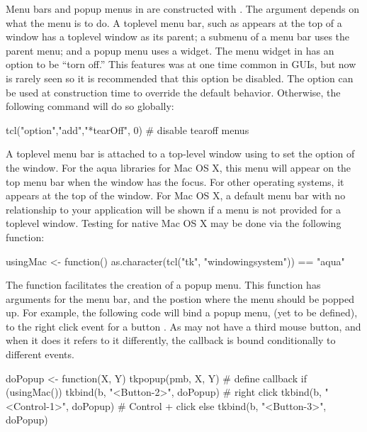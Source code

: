 Menu bars and popup menus in \Tk\/ are constructed with
. The  argument depends on what the menu is
to do. A toplevel menu bar, such as appears at the top of a window has
a toplevel window as its parent; a submenu of a menu bar uses the
parent menu; and a popup menu uses a widget.  The menu widget in \Tk\/
has an option to be ``torn off.'' This features was at one time common
in GUIs, but now is rarely seen so it is recommended that this option
be disabled. The  option can be used at
construction time to override the default behavior. Otherwise, the
following command will do so globally:
\begin{Schunk}
\begin{Sinput}
 tcl("option","add","*tearOff", 0)    # disable tearoff menus
\end{Sinput}
\end{Schunk}

A toplevel menu bar is attached to a top-level window using 
to set the  option of the window. For the aqua \TK\/
libraries for Mac OS X, this menu will appear on the top menu bar when
the window has the focus. For other operating systems, it appears at
the top of the window. For Mac OS X, a default menu bar with no
relationship to your application will be shown if a menu is not
provided for a toplevel window. Testing for native Mac OS X may be done via
the following function:
\begin{Schunk}
\begin{Sinput}
 usingMac <- function()  
   as.character(tcl("tk", "windowingsystem")) == "aqua"
\end{Sinput}
\end{Schunk}

The  function facilitates the creation of a popup
menu.  This function has arguments for the menu bar, and the postion
where the menu should be popped up. For example, the following code
will bind a popup menu,  (yet to be defined), to the right click event for a
button . As \OSX\/ may not have a third mouse button, and when
it does it refers to it differently, the callback is bound
conditionally to different events.


\begin{Schunk}
\begin{Sinput}
 doPopup <- function(X, Y) tkpopup(pmb, X, Y) # define callback
 if (usingMac()) {
   tkbind(b, "<Button-2>", doPopup)      # right click
   tkbind(b, "<Control-1>", doPopup)     # Control + click
 } else {
   tkbind(b, "<Button-3>", doPopup)
 }
\end{Sinput}
\end{Schunk}


